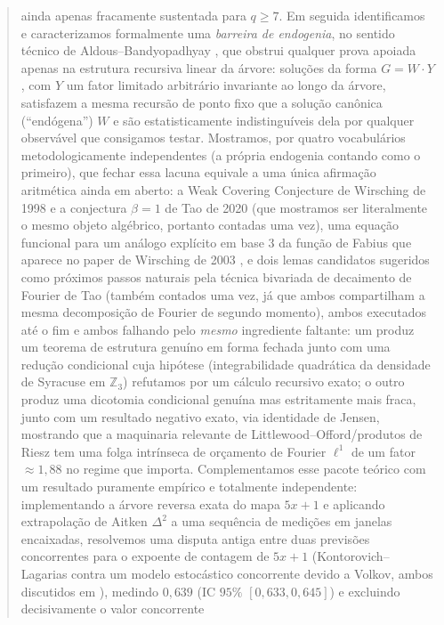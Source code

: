 \documentclass[11pt]{article}
\theoremstyle{definition}
\theoremstyle{remark}
\begin{document}
\begin{abstract}
ainda apenas fracamente sustentada para $q\ge7$. Em seguida
identificamos e caracterizamos formalmente uma \emph{barreira de
endogenia}, no sentido técnico de Aldous--Bandyopadhyay
\cite{AldousBandyopadhyay2005}, que obstrui qualquer prova apoiada
apenas na estrutura recursiva linear da árvore: soluções da forma
$G = W\cdot Y$, com $Y$ um fator limitado arbitrário invariante ao
longo da árvore, satisfazem a mesma recursão de ponto fixo que a
solução canônica (``endógena'') $W$ e são estatisticamente
indistinguíveis dela por qualquer observável que consigamos testar.
Mostramos, por quatro vocabulários metodologicamente independentes (a
própria endogenia contando como o primeiro), que fechar essa lacuna
equivale a uma única afirmação aritmética ainda em aberto: a Weak
Covering Conjecture de Wirsching de 1998 \cite{Wirsching1998} e a
conjectura $\beta=1$ de Tao de 2020 \cite{Tao2020} (que mostramos ser
literalmente o mesmo objeto algébrico, portanto contadas uma vez),
uma equação funcional para um análogo explícito em base $3$ da função
de Fabius que aparece no paper de Wirsching de 2003
\cite{Wirsching2003}, e dois lemas candidatos sugeridos como próximos
passos naturais pela técnica bivariada de decaimento de Fourier de Tao
\cite{Tao2022,Tao2011} (também contados uma vez, já que ambos
compartilham a mesma decomposição de Fourier de segundo momento), ambos
executados até o fim e ambos falhando pelo \emph{mesmo} ingrediente
faltante: um produz um teorema de
estrutura genuíno em forma fechada junto com uma redução condicional
cuja hipótese (integrabilidade quadrática da densidade de Syracuse em
$\mathbb{Z}_3$) refutamos por um cálculo recursivo exato; o outro
produz uma dicotomia condicional genuína mas estritamente mais fraca,
junto com um resultado negativo exato, via identidade de Jensen,
mostrando que a maquinaria relevante de Littlewood--Offord/produtos de
Riesz tem uma folga intrínseca de orçamento de Fourier $\ell^1$ de um
fator $\approx 1{,}88$ no regime que importa. Complementamos esse
pacote teórico com um resultado puramente empírico e totalmente
independente: implementando a árvore reversa exata do mapa $5x+1$ e
aplicando extrapolação de Aitken $\Delta^2$ a uma sequência de medições em
janelas encaixadas, resolvemos uma disputa antiga entre duas previsões
concorrentes para o expoente de contagem de $5x+1$
(Kontorovich--Lagarias \cite{KontorovichLagarias2009} contra um modelo
estocástico concorrente devido a Volkov, ambos discutidos em
\cite{KontorovichLagarias2009}), medindo $0{,}639$ (IC $95\%$
$[0{,}633,0{,}645]$) e excluindo decisivamente o valor concorrente

\end{abstract}
\end{document}
